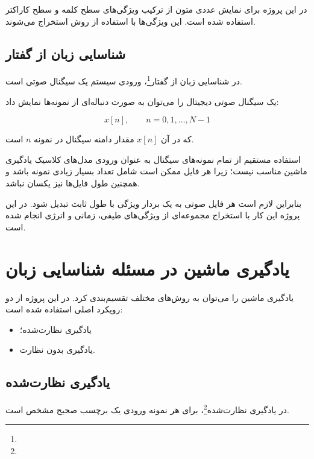 \documentclass[12pt,a4paper,oneside]{report}
\begin{document}
در این پروژه برای نمایش عددی متون از ترکیب ویژگی‌های سطح کلمه و سطح کاراکتر استفاده شده است. این ویژگی‌ها با استفاده از روش
استخراج می‌شوند.


\subsection{شناسایی زبان از گفتار}

در شناسایی زبان از گفتار\footnote{}، ورودی سیستم یک سیگنال صوتی است.

یک سیگنال صوتی دیجیتال را می‌توان به صورت دنباله‌ای از نمونه‌ها نمایش داد:

\begin{equation}
x[n], \qquad n=0,1,\ldots,N-1
\end{equation}

که در آن $x[n]$ مقدار دامنه سیگنال در نمونه $n$ است.

استفاده مستقیم از تمام نمونه‌های سیگنال به عنوان ورودی مدل‌های کلاسیک یادگیری ماشین مناسب نیست؛ زیرا هر فایل ممکن است شامل تعداد بسیار زیادی نمونه باشد و همچنین طول فایل‌ها نیز یکسان نباشد.

بنابراین لازم است هر فایل صوتی به یک بردار ویژگی با طول ثابت تبدیل شود. در این پروژه این کار با استخراج مجموعه‌ای از ویژگی‌های طیفی، زمانی و انرژی انجام شده است.


\section{یادگیری ماشین در مسئله شناسایی زبان}

یادگیری ماشین را می‌توان به روش‌های مختلف تقسیم‌بندی کرد. در این پروژه از دو رویکرد اصلی استفاده شده است:

\begin{itemize}
	\item یادگیری نظارت‌شده؛
	\item یادگیری بدون نظارت.
\end{itemize}


\subsection{یادگیری نظارت‌شده}

در یادگیری نظارت‌شده\footnote{}، برای هر نمونه ورودی یک برچسب صحیح مشخص است.
\end{document}
